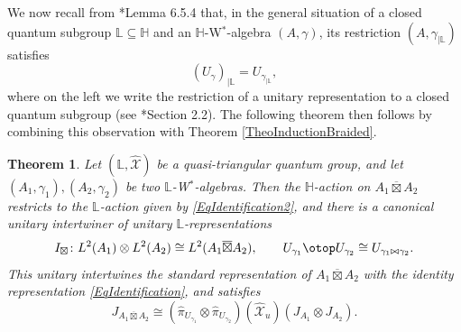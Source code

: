 \documentclass[reqno]{amsart}
\numberwithin{equation}{section}
\newtheorem{Theorem}{Theorem}[section]
\newcommand{\Ll}{\mathbb{L}}
\newcommand{\Hh}{\mathbb{H}}
\newcommand{\barboxtimes}{\overline{\boxtimes}}
\newcommand{\mcX}{\mathcal{X}}
\newcommand{\ov}{\overline}
\newcommand{\mc}{\mathcal}
\newcommand{\wh}{\widehat}
\newcommand{\TensRep}{\otop}
\begin{document}
We now recall from \cite{DC09}*{Lemma 6.5.4} that, in the general situation of a closed quantum subgroup $\Ll \subseteq \Hh$ and an $\Hh$-W$^*$-algebra $(A,\gamma)$, its restriction $(A,\gamma_{\mid \Ll})$ satisfies 
\[
(U_{\gamma})_{\mid \Ll} = U_{\gamma_{\mid \Ll}},
\]
where on the left we write the restriction of a unitary representation to a closed quantum subgroup (see \cite{DCKr24}*{Section 2.2}). The following theorem then follows by combining this observation with Theorem \ref{TheoInductionBraided}.

\begin{Theorem}\label{TheoMainResultDone}
Let $(\Ll,\wh{\mcX})$ be a quasi-triangular quantum group, and let $(A_1,\gamma_1),(A_2,\gamma_2)$ be two $\Ll$-W$^*$-algebras. Then the $\Hh$-action on $A_1\ov{\boxtimes}A_2$ restricts to the $\Ll$-action given by \eqref{EqIdentification2}, and there is a canonical unitary intertwiner of unitary $\Ll$-representations 
\begin{equation}\label{EqFormulaImplBraid}
I_\boxtimes \colon L^2(A_1)\otimes L^2(A_2)\cong L^2(A_1\ov{\boxtimes} A_2),
\qquad U_{\gamma_1} \TensRep U_{\gamma_2} \cong  U_{\gamma_1\bowtie \gamma_2}
.
\end{equation}
This unitary intertwines the standard representation of $A_1\ov\boxtimes A_2$ with the identity representation \eqref{EqIdentification}, and satisfies 
\begin{equation}\label{eq53}
J_{A_1\barboxtimes A_2}\cong 
(\hat{\pi}_{U_{\gamma_1}}\otimes 
\hat{\pi}_{U_{\gamma_2}})(\wh{\mc{X}}_u)
(J_{A_1}\otimes J_{A_2}) .
\end{equation}
\end{Theorem} 
\end{document}
